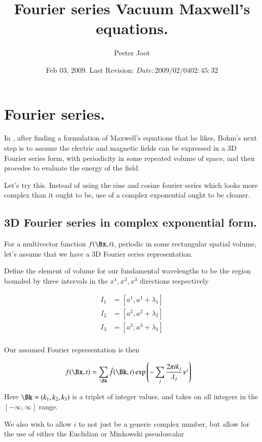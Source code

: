 \documentclass{article}
\title{ Fourier series Vacuum Maxwell's equations. }
\author{Peeter Joot}
\date{ Feb 03, 2009.  Last Revision: $Date: 2009/02/04 02:45:32 $ }
\begin{document}
\maketitle{}

\tableofcontents

\section{ Fourier series. }

In \cite{bohm1989qt}, 
after finding a formulation of Maxwell's equations that he likes, Bohm's next
step is to assume the electric and magnetic fields can be expressed in 
a 3D Fourier series form, with periodicity in some repeated volume 
of space, and then procedes to evaluate the energy of the 
field.

Let's try this.  Instead of using the sine and cosine fourier series
which looks more complex than it ought to be, use of a complex exponential
ought to be cleaner.

\subsection{ 3D Fourier series in complex exponential form. }

For a multivector function $f(\Bx, t)$, periodic in some rectangular spatial volume, let's assume that we have a
3D Fourier series representation.

Define the element of volume for our fundamental wavelengths to be the region bounded by three intervals in the $x^1, x^2, x^3$ directions respectively

\begin{align*}
I_1 &= [ a^1, a^1 + \lambda_1 ] \\
I_2 &= [ a^2, a^2 + \lambda_2 ] \\
I_3 &= [ a^3, a^3 + \lambda_3 ] \\
\end{align*}

Our assumed Fourier representation is then

\begin{align*}
f(\Bx, t) &= \sum_{\Bk} \hat{f}(\Bk, t) \exp\left( - \sum_j \frac{2 \pi i k_j}{\lambda_j} x^j\right)
\end{align*}

Here $\Bk = (k_1, k_2, k_3)$ is a triplet of integer values, and takes on all integers in the $[-\infty, \infty]$ range.

We also wish to allow $i$ to not just be a generic complex number, but allow for the use of either the Euclidian or Minkowski pseudoscalar
\end{document}
